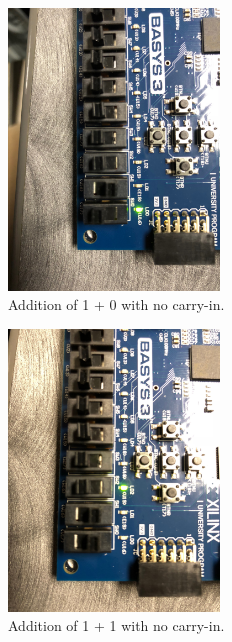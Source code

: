 \documentclass[11pt]{article}
\begin{document}
\begin{figure}[H]
\begin{center}
\includegraphics[width=0.5\textwidth]{report-images/Part3/IMG_0451.jpg}
\caption{Addition of 1 + 0 with no carry-in.}
\label{fig:fullAdderImgThree}
\end{center}
\end{figure}

\begin{figure}[H]
\begin{center}
\includegraphics[width=0.5\textwidth]{report-images/Part3/IMG_0452.jpg}
\caption{Addition of 1 + 1  with no carry-in.}
\label{fig:fullAdderImgFour}
\end{center}
\end{figure}
\end{document}
